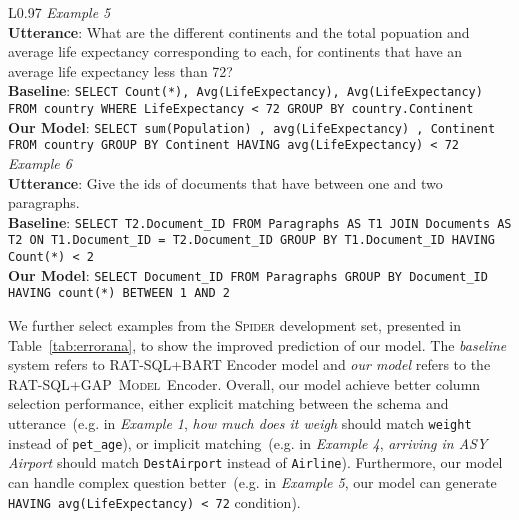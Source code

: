 \documentclass[letterpaper]{article} \usepackage{aaai21}  \usepackage{times}  \usepackage{helvet} \usepackage{courier}  \usepackage[hyphens]{url}  \usepackage{graphicx} \usepackage{booktabs}
\newcommand{\modelnamelm}{\textsc{GAP~Model}}
\begin{document}
\begin{table*}[t]
\begin{tabularx}{\linewidth}{L{0.97 \linewidth}}
    \midrule \midrule
    \textit{Example 5} \\
    \textbf{Utterance}: What are the different continents and the total popuation and average life expectancy corresponding to each, for continents that have an average life expectancy less than 72? \\
    \textbf{Baseline}: \texttt{SELECT Count(*), Avg(LifeExpectancy), Avg(LifeExpectancy) FROM country WHERE LifeExpectancy < 72 GROUP BY country.Continent} \\
    \textbf{Our Model}: \texttt{SELECT sum(Population) ,  avg(LifeExpectancy) ,  Continent FROM country GROUP BY Continent HAVING avg(LifeExpectancy)  <  72} \\
    \midrule
    \textit{Example 6} \\
    \textbf{Utterance}: Give the ids of documents that have between one and two paragraphs. \\
    \textbf{Baseline}: \texttt{SELECT T2.Document\_ID FROM Paragraphs AS T1 JOIN Documents AS T2 ON T1.Document\_ID = T2.Document\_ID GROUP BY T1.Document\_ID HAVING Count(*) < 2} \\
    \textbf{Our Model}: \texttt{SELECT Document\_ID FROM Paragraphs GROUP BY Document\_ID HAVING count(*) BETWEEN 1 AND 2} \\
    \bottomrule
    \end{tabularx}\caption{Selected Examples.}
  \label{tab:errorana}\vspace{-3mm}
\end{table*}

We further select examples from the \textsc{Spider} development set, presented in Table~\ref{tab:errorana}, to show the improved prediction of our model.
The \textit{baseline} system refers to RAT-SQL+BART Encoder model and \textit{our model} refers to the RAT-SQL+\modelnamelm~Encoder.
Overall, our model achieve better column selection performance, either explicit matching between the schema and utterance~(e.g. in \textit{Example 1}, \textit{how much does it weigh} should match \texttt{weight} instead of \texttt{pet\_age}), or implicit matching~(e.g. in \textit{Example 4}, \textit{arriving in ASY Airport} should match \texttt{DestAirport} instead of \texttt{Airline}).
Furthermore, our model can handle complex question better~(e.g. in \textit{Example 5}, our model can generate \texttt{HAVING avg(LifeExpectancy) < 72} condition).
\end{document}
